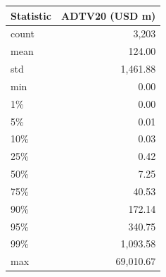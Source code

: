 \begin{tabular}{@{}lr@{}}
\toprule
Statistic & ADTV20 (USD m) \\
\midrule
count & 3,203 \\
mean & 124.00 \\
std & 1,461.88 \\
min & 0.00 \\
1\% & 0.00 \\
5\% & 0.01 \\
10\% & 0.03 \\
25\% & 0.42 \\
50\% & 7.25 \\
75\% & 40.53 \\
90\% & 172.14 \\
95\% & 340.75 \\
99\% & 1,093.58 \\
max & 69,010.67 \\
\bottomrule
\end{tabular}
